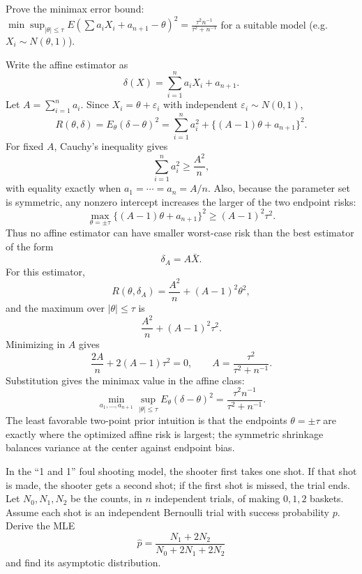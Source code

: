 \begin{exercise}
\label{applied:2010:9}
Prove the minimax error bound: $\min \sup_{|\theta| \le \tau} E (\sum a_i X_i + a_{n+1} - \theta)^2 = \frac{\tau^2 n^{-1}}{\tau^2 + n^{-1}}$ for a suitable model (e.g. $X_i \sim N(\theta, 1)$).
\end{exercise}

\begin{solution}
Write the affine estimator as
\[
\delta(X)=\sum_{i=1}^n a_iX_i+a_{n+1}.
\]
Let $A=\sum_{i=1}^n a_i$. Since $X_i=\theta+\varepsilon_i$ with independent $\varepsilon_i\sim N(0,1)$,
\[
R(\theta,\delta)
=E_\theta(\delta-\theta)^2
=\sum_{i=1}^n a_i^2+\{(A-1)\theta+a_{n+1}\}^2.
\]
For fixed $A$, Cauchy's inequality gives
\[
\sum_{i=1}^n a_i^2\geq \frac{A^2}{n},
\]
with equality exactly when $a_1=\cdots=a_n=A/n$. Also, because the parameter set is symmetric, any nonzero intercept increases the larger of the two endpoint risks:
\[
\max_{\theta=\pm\tau}\{(A-1)\theta+a_{n+1}\}^2
\geq (A-1)^2\tau^2.
\]
Thus no affine estimator can have smaller worst-case risk than the best estimator of the form
\[
\delta_A=A\bar X.
\]
For this estimator,
\[
R(\theta,\delta_A)=\frac{A^2}{n}+(A-1)^2\theta^2,
\]
and the maximum over $|\theta|\leq\tau$ is
\[
\frac{A^2}{n}+(A-1)^2\tau^2.
\]
Minimizing in $A$ gives
\[
\frac{2A}{n}+2(A-1)\tau^2=0,
\qquad
A=\frac{\tau^2}{\tau^2+n^{-1}}.
\]
Substitution gives the minimax value in the affine class:
\[
\min_{a_1,\ldots,a_{n+1}}\sup_{|\theta|\leq\tau}
E_\theta(\delta-\theta)^2
=\frac{\tau^2 n^{-1}}{\tau^2+n^{-1}}.
\]
The least favorable two-point prior intuition is that the endpoints $\theta=\pm\tau$ are exactly where the optimized affine risk is largest; the symmetric shrinkage balances variance at the center against endpoint bias.
\end{solution}

\begin{exercise}
\label{applied:2010:10}
In the ``1 and 1'' foul shooting model, the shooter first takes one shot. If that shot is made, the shooter gets a second shot; if the first shot is missed, the trial ends. Let $N_0,N_1,N_2$ be the counts, in $n$ independent trials, of making $0,1,2$ baskets. Assume each shot is an independent Bernoulli trial with success probability $p$. Derive the MLE
\[
\widehat p=\frac{N_1+2N_2}{N_0+2N_1+2N_2}
\]
and find its asymptotic distribution.
\end{exercise}

